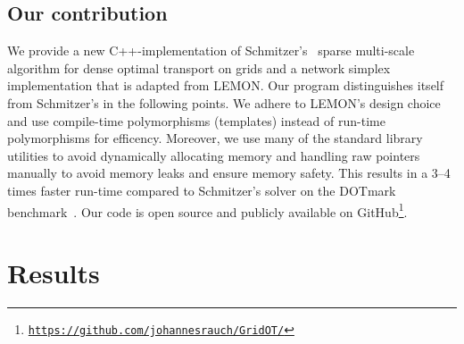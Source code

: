 \documentclass[a4paper,UKenglish,cleveref, autoref, thm-restate]{lipics-v2021}
\begin{document}
\subsection{Our contribution}
We provide a new C++-implementation of Schmitzer's~\cite{schmitzer2016sparse} sparse multi-scale algorithm for dense optimal transport on grids and a network simplex implementation that is adapted from LEMON.
Our program distinguishes itself from Schmitzer's in the following points.
We adhere to LEMON's design choice and use compile-time polymorphisms (templates) instead of run-time polymorphisms for efficency.
Moreover, we use many of the standard library utilities to avoid dynamically allocating memory and handling raw pointers manually to avoid memory leaks and ensure memory safety.
This results in a 3--4 times faster run-time compared to Schmitzer's solver on the DOTmark benchmark~\cite{schrieber2017dotmark}.
Our code is open source and publicly available on GitHub\footnote{\href{https://github.com/johannesrauch/GridOT/}{\texttt{https://github.com/johannesrauch/GridOT/}}}.

\section{Results}



\end{document}
